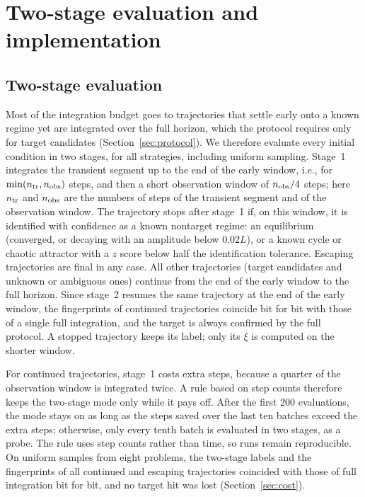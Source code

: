 \section{Two-stage evaluation and implementation}\label{app:implementation}

\subsection{Two-stage evaluation}\label{sec:twostage}

Most of the integration budget goes to trajectories that settle early onto a known regime yet are integrated over the full horizon, which the protocol requires only for target candidates (Section~\ref{sec:protocol}). We therefore evaluate every initial condition in two stages, for all strategies, including uniform sampling. Stage~1 integrates the transient segment up to the end of the early window, i.e., for $\min(n_{\rm tr},n_{\rm obs})$ steps, and then a short observation window of $n_{\rm obs}/4$ steps; here $n_{\rm tr}$ and $n_{\rm obs}$ are the numbers of steps of the transient segment and of the observation window. The trajectory stops after stage~1 if, on this window, it is identified with confidence as a known nontarget regime: an equilibrium (converged, or decaying with an amplitude below $0.02L$), or a known cycle or chaotic attractor with a $z$ score below half the identification tolerance. Escaping trajectories are final in any case. All other trajectories (target candidates and unknown or ambiguous ones) continue from the end of the early window to the full horizon. Since stage~2 resumes the same trajectory at the end of the early window, the fingerprints of continued trajectories coincide bit for bit with those of a single full integration, and the target is always confirmed by the full protocol. A stopped trajectory keeps its label; only its $\xi$ is computed on the shorter window.

For continued trajectories, stage~1 costs extra steps, because a quarter of the observation window is integrated twice. A rule based on step counts therefore keeps the two-stage mode only while it pays off. After the first 200 evaluations, the mode stays on as long as the steps saved over the last ten batches exceed the extra steps; otherwise, only every tenth batch is evaluated in two stages, as a probe. The rule uses step counts rather than time, so runs remain reproducible. On uniform samples from eight problems, the two-stage labels and the fingerprints of all continued and escaping trajectories coincided with those of full integration bit for bit, and no target hit was lost (Section~\ref{sec:cost}).

